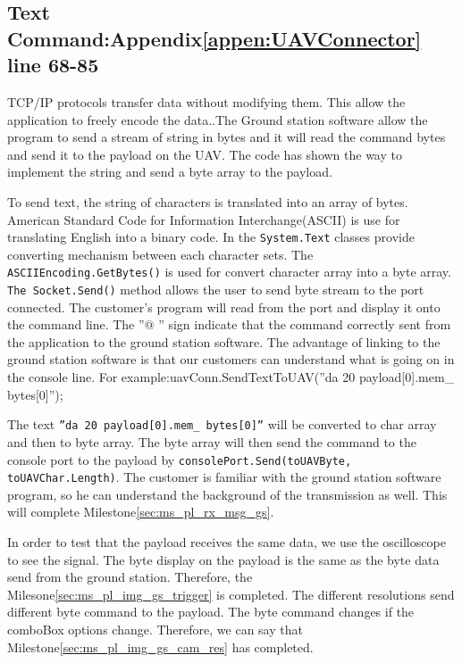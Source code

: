 \subsection{Text Command:Appendix\ref{appen:UAVConnector} line 68-85}
TCP/IP protocols transfer data without modifying them. This allow the application to freely encode the data.\cite{davidB}.The Ground station software allow the program to send a stream of string in bytes and it will read the command bytes and send it to the payload on the UAV. The code has shown the way to implement the string and send a byte array to the payload.

To send text, the string of characters is translated into an array of bytes. American Standard Code for Information Interchange(ASCII) is use for translating English into a binary code. In the \texttt{System.Text} classes provide converting mechanism between each character sets. The \texttt{ASCIIEncoding.GetBytes()} is used for convert character array into a byte array.  
\texttt{The Socket.Send()} method allows the user to send byte stream to the port connected. The customer's program will read from the port and display it onto the command line. The ''@ '' sign indicate that the command correctly sent from the application to the ground station software. The advantage of linking to the ground station software is that our customers can understand what is going on in the console line. For example:uavConn.SendTextToUAV(''da 20 payload[0].mem\_ bytes[0]'');


The text \texttt{''da 20 payload[0].mem\_ bytes[0]''} will be converted to char array and then to byte array. The byte array will then send the command to the console port to the payload by \texttt{consolePort.Send(toUAVByte, toUAVChar.Length)}. The customer is familiar with the ground station software program, so he can understand the background of the transmission as well. This will complete Milestone\ref{sec:ms_pl_rx_msg_gs}.

In order to test that the payload receives the same data, we use the oscilloscope to see the signal. The byte display on the payload is the same as the byte data send from the ground station. Therefore, the Milesone\ref{sec:ms_pl_img_gs_trigger} is completed. The different resolutions send different byte command to the payload. The byte command changes if the comboBox options change. Therefore, we can say that Milestone\ref{sec:ms_pl_img_gs_cam_res} has completed.

